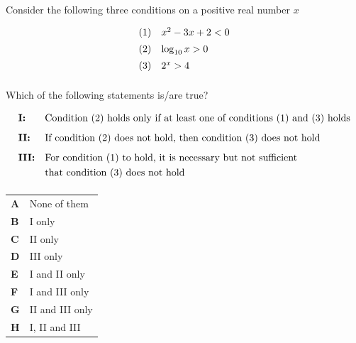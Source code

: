 \documentclass[11pt,a4paper]{article}
\begin{document}
\begin{enumerate}[label=\textbf{\arabic*.},leftmargin=*,itemsep=0pt,start=10]
\questionitem[Logic]
Consider the following three conditions on a positive real number $x$

\[
\begin{array}{@{}ll@{}}
(1) & x^2 - 3x + 2 < 0 \\[5pt]
(2) & \log_{10} x > 0 \\[5pt]
(3) & 2^x > 4 \\[5pt]
\end{array}\]

Which of the following statements is/are true?

\[
\begin{array}{@{}l l@{}}
\textbf{I:} & \text{Condition (2) holds only if at least one of conditions (1) and (3) holds} \\[8pt]
\textbf{II:} & \text{If condition (2) does not hold, then condition (3) does not hold} \\[8pt]
\textbf{III:} &
\begin{aligned}[t]
&\text{For condition (1) to hold, it is necessary but not sufficient} \\
&\text{that condition (3) does not hold} \\[5pt]
\end{aligned}
\end{array}
\]

\par\vspace*{12pt}
\begin{tabularx}{\linewidth}{@{}>{\bfseries}l Y@{}}
A &
None of them
\\[0.8em]
B &
I only
\\[0.8em]
C &
II only
\\[0.8em]
D &
III only
\\[0.8em]
E &
I and II only
\\[0.8em]
F &
I and III only
\\[0.8em]
G &
II and III only
\\[0.8em]
H &
I, II and III
\\
\end{tabularx}


\end{enumerate}
\end{document}
